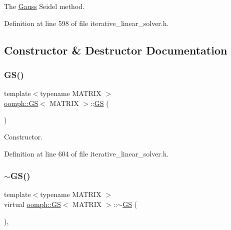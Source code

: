The \hyperlink{classoomph_1_1Gauss}{Gauss} Seidel method. 

Definition at line 598 of file iterative\+\_\+linear\+\_\+solver.\+h.



\subsection{Constructor \& Destructor Documentation}
\mbox{\label{classoomph_1_1GS_ab3817b7d1c6fc7c6307012dfc1b546b4}} 
\subsubsection{\texorpdfstring{G\+S()}{GS()}\hspace{0.1cm}{\footnotesize\ttfamily [1/2]}}
{\footnotesize\ttfamily template$<$typename M\+A\+T\+R\+IX $>$ \\
\hyperlink{classoomph_1_1GS}{oomph\+::\+GS}$<$ M\+A\+T\+R\+IX $>$\+::\hyperlink{classoomph_1_1GS}{GS} (\begin{DoxyParamCaption}{ }\end{DoxyParamCaption})\hspace{0.3cm}{\ttfamily [inline]}}



Constructor. 



Definition at line 604 of file iterative\+\_\+linear\+\_\+solver.\+h.

\mbox{\label{classoomph_1_1GS_a23bc92ce372a160a9ac5fef91ec87cd4}} 
\subsubsection{\texorpdfstring{$\sim$\+G\+S()}{~GS()}}
{\footnotesize\ttfamily template$<$typename M\+A\+T\+R\+IX $>$ \\
virtual \hyperlink{classoomph_1_1GS}{oomph\+::\+GS}$<$ M\+A\+T\+R\+IX $>$\+::$\sim$\hyperlink{classoomph_1_1GS}{GS} (\begin{DoxyParamCaption}{ }\end{DoxyParamCaption})\hspace{0.3cm}{\ttfamily [inline]}, {\ttfamily [virtual]}}




